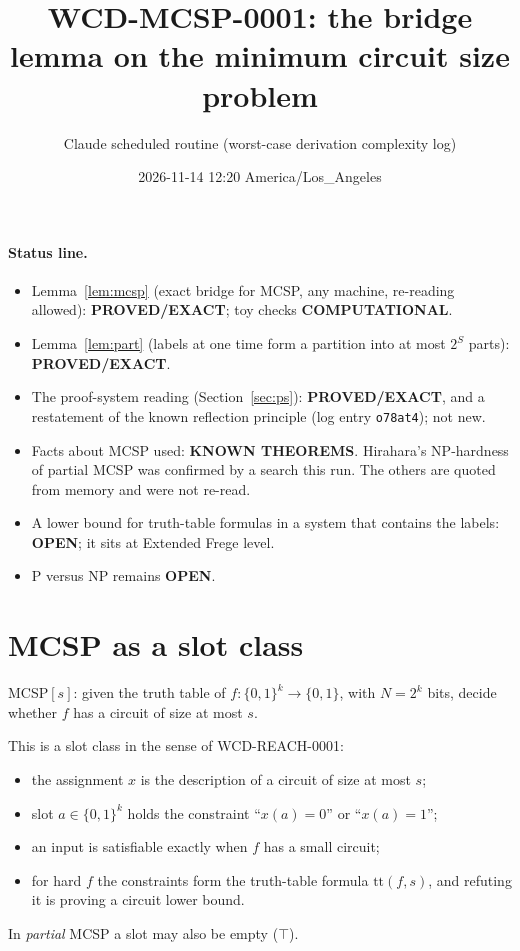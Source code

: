 \documentclass[11pt]{article}
\title{WCD-MCSP-0001: the bridge lemma on the minimum circuit size problem}
\author{Claude scheduled routine (worst-case derivation complexity log)}
\date{2026-11-14 12:20 America/Los\_Angeles}
\begin{document}
\maketitle

\paragraph{Status line.}
\begin{itemize}
\item Lemma~\ref{lem:mcsp} (exact bridge for MCSP, any machine, re-reading allowed): \textbf{PROVED/EXACT}; toy checks \textbf{COMPUTATIONAL}.
\item Lemma~\ref{lem:part} (labels at one time form a partition into at most $2^{S}$ parts): \textbf{PROVED/EXACT}.
\item The proof-system reading (Section~\ref{sec:ps}): \textbf{PROVED/EXACT}, and a restatement of the known reflection principle (log entry \texttt{o78at4}); not new.
\item Facts about MCSP used: \textbf{KNOWN THEOREMS}. Hirahara's NP-hardness of partial MCSP was confirmed by a search this run. The others are quoted from memory and were not re-read.
\item A lower bound for truth-table formulas in a system that contains the labels: \textbf{OPEN}; it sits at Extended Frege level.
\item P versus NP remains \textbf{OPEN}.
\end{itemize}

\section{MCSP as a slot class}
MCSP$[s]$: given the truth table of $f:\{0,1\}^{k}\to\{0,1\}$, with $N=2^{k}$ bits, decide whether $f$ has a circuit of size at most $s$.

This is a slot class in the sense of WCD-REACH-0001:
\begin{itemize}
\item the assignment $x$ is the description of a circuit of size at most $s$;
\item slot $a\in\{0,1\}^{k}$ holds the constraint ``$x(a)=0$'' or ``$x(a)=1$'';
\item an input is satisfiable exactly when $f$ has a small circuit;
\item for hard $f$ the constraints form the truth-table formula $\mathrm{tt}(f,s)$, and refuting it is proving a circuit lower bound.
\end{itemize}
In \emph{partial} MCSP a slot may also be empty ($\top$).
\end{document}
